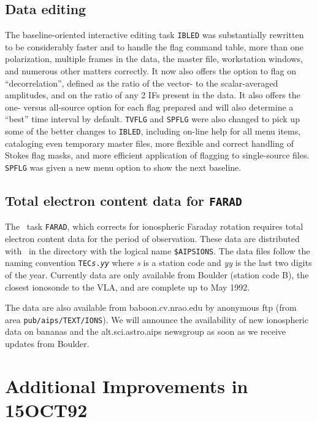 \subsection{Data editing}

The baseline-oriented interactive editing task {\tt IBLED} was
substantially rewritten to be considerably faster and to handle the
flag command table, more than one polarization, multiple frames in the
data, the master file, workstation windows, and numerous other matters
correctly.  It now also offers the option to flag on
``decorrelation'', defined as the ratio of the vector- to the
scalar-averaged amplitudes, and on the ratio of any 2 IFs present in
the data.  It also offers the one- versus all-source option for each
flag prepared and will also determine a ``best'' time interval by
default.  {\tt TVFLG} and {\tt SPFLG} were also changed to pick up some
of the better changes to {\tt IBLED}, including on-line help for all
menu items, cataloging even temporary master files, more flexible and
correct handling of Stokes flag masks, and more efficient application
of flagging to single-source files.  {\tt SPFLG} was given a new menu
option to show the next baseline.

\subsection{Total electron content data for {\tt FARAD}}

The \AIPS\ task {\tt FARAD}, which corrects for ionospheric Faraday
rotation requires total electron content data for the period of
observation.  These data are distributed with \AIPS\ in the directory
with the logical name \hbox{{\tt \$AIPSIONS}}.  The data files follow
the naming convention {\tt TEC{\it s}.{\it yy}} where {\it s} is a
station code and {\it yy} is the last two digits of the year.
Currently data are only available from Boulder (station code B), the
closest ionosonde to the VLA, and are complete up to May 1992.

The data are also available from baboon.cv.nrao.edu by anonymous ftp
(from area {\tt pub/aips/TEXT/IONS}).  We will announce the
availability of new ionospheric data on bananas and the
alt.sci.astro.aips newsgroup as soon as we receive updates from
Boulder.

\section{Additional Improvements in 15OCT92}

